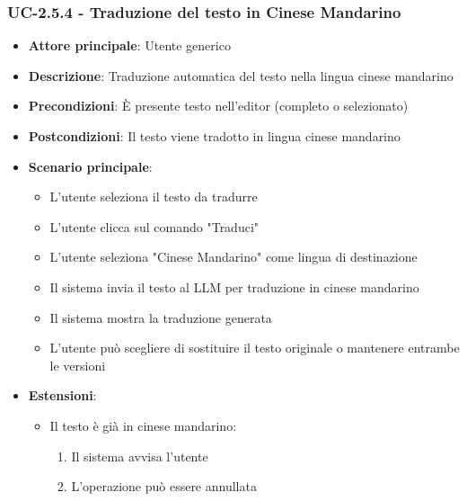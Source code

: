 \documentclass[11pt,a4paper]{article}
\begin{document}
\subsubsection{UC-2.5.4 - Traduzione del testo in Cinese Mandarino}
\begin{itemize}
    \item \textbf{Attore principale}: Utente generico
    \item \textbf{Descrizione}: Traduzione automatica del testo nella lingua cinese mandarino
    \item \textbf{Precondizioni}: È presente testo nell'editor (completo o selezionato)
    \item \textbf{Postcondizioni}: Il testo viene tradotto in lingua cinese mandarino
    \item \textbf{Scenario principale}:
        \begin{itemize}
            \item L'utente seleziona il testo da tradurre
            \item L'utente clicca sul comando "Traduci"
            \item L'utente seleziona "Cinese Mandarino" come lingua di destinazione
            \item Il sistema invia il testo al LLM per traduzione in cinese mandarino
            \item Il sistema mostra la traduzione generata
            \item L'utente può scegliere di sostituire il testo originale o mantenere entrambe le versioni
        \end{itemize}
    \item \textbf{Estensioni}:
        \begin{itemize}
            \item Il testo è già in cinese mandarino:
                \begin{enumerate}
                    \item Il sistema avvisa l'utente
                    \item L'operazione può essere annullata
                \end{enumerate}
        \end{itemize}
\end{itemize}
\end{document}
